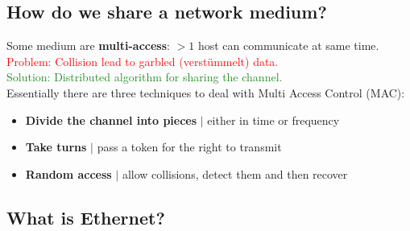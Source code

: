 \documentclass[a4paper, fontsize=8pt, landscape, DIV=1]{scrartcl}
\begin{document}
\begin{multicols*}{4}
   			\subsection{How do we share a network medium?}
   			Some medium are \textbf{multi-access}: $>1$ host can communicate at same time.\\
   			\textcolor{Red}{Problem: Collision lead to garbled (verstümmelt) data.}\\
   			\textcolor{ForestGreen}{Solution: Distributed algorithm for sharing the channel.}\\
   			Essentially there are three techniques to deal with Multi Access Control (MAC):
   			\begin{itemize}[noitemsep]
   				\item \textbf{Divide the channel into pieces} $\vert$ either in time or frequency
   				\item \textbf{Take turns} $\vert$ pass a token for the right to transmit
   				\item \textbf{Random access} $\vert$ allow collisions, detect them and then recover
   			\end{itemize} 
   			
   			\subsection{What is Ethernet?}
   			
		\end{multicols*}
	\setcounter{secnumdepth}{3}
\end{document}
